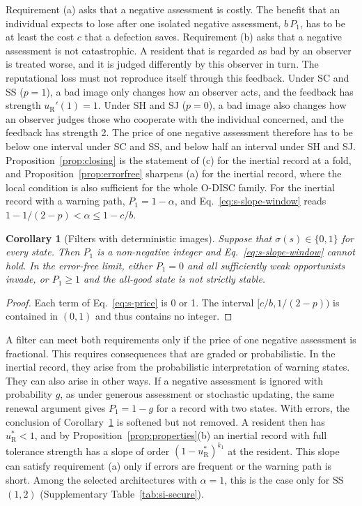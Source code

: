 \documentclass[10pt]{wlscirep}
\newcommand{\uR}{u_{\mathrm{R}}^{*}}
\newcommand{\Pone}{P_{1}}                  %
\theoremstyle{plain}
\newtheorem{corollary}[lemma]{Corollary}
\theoremstyle{remark}
\begin{document}
Requirement (a) asks that a negative assessment is costly. The benefit that an individual expects to lose after one isolated negative assessment, $b\,\Pone$, has to be at least the cost $c$ that a defection saves. Requirement (b) asks that a negative assessment is not catastrophic. A resident that is regarded as bad by an observer is treated worse, and it is judged differently by this observer in turn. The reputational loss must not reproduce itself through this feedback. Under SC and SS ($p=1$), a bad image only changes how an observer acts, and the feedback has strength $u_{\mathrm R}'(1)=1$. Under SH and SJ ($p=0$), a bad image also changes how an observer judges those who cooperate with the individual concerned, and the feedback has strength 2. The price of one negative assessment therefore has to be below one interval under SC and SS, and below half an interval under SH and SJ. Proposition~\ref{prop:closing} is the statement of (c) for the inertial record at a fold, and Proposition~\ref{prop:errorfree} sharpens (a) for the inertial record, where the local condition is also sufficient for the whole O-DISC family. For the inertial record with a warning path, $\Pone=1-\alpha$, and Eq.~\eqref{eq:s-slope-window} reads $1-1/(2-p)<\alpha\leq1-c/b$.

\begin{corollary}[Filters with deterministic images]\label{cor:deterministic}
Suppose that $\sigma(s)\in\{0,1\}$ for every state. Then $\Pone$ is a non-negative integer and Eq.~\eqref{eq:s-slope-window} cannot hold. In the error-free limit, either $\Pone=0$ and all sufficiently weak opportunists invade, or $\Pone\geq1$ and the all-good state is not strictly stable.
\end{corollary}
\begin{proof}
Each term of Eq.~\eqref{eq:s-price} is 0 or 1. The interval $[c/b,1/(2-p))$ is contained in $(0,1)$ and thus contains no integer.
\end{proof}

A filter can meet both requirements only if the price of one negative assessment is fractional. This requires consequences that are graded or probabilistic. In the inertial record, they arise from the probabilistic interpretation of warning states. They can also arise in other ways. If a negative assessment is ignored with probability $g$, as under generous assessment or stochastic updating, the same renewal argument gives $\Pone=1-g$ for a record with two states. With errors, the conclusion of Corollary~\ref{cor:deterministic} is softened but not removed. A resident then has $\uR<1$, and by Proposition~\ref{prop:properties}(b) an inertial record with full tolerance strength has a slope of order $(1-\uR)^{k_1}$ at the resident. This slope can satisfy requirement (a) only if errors are frequent or the warning path is short. Among the selected architectures with $\alpha=1$, this is the case only for SS $(1,2)$ (Supplementary Table~\ref{tab:si-secure}).
\end{document}
